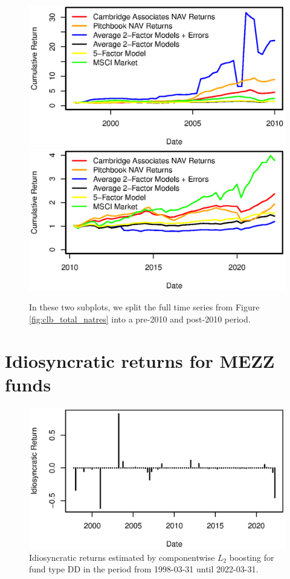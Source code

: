 \begin{figure}[H]
	\centering
	\includegraphics{Figures/XTotalErrorSeriesNATRESpre2010}
	\includegraphics{Figures/XTotalErrorSeriesNATRESpost2010}
	\caption{
		In these two subplots, we split the full time series from Figure \ref{fig:clb_total_natres} into a pre-2010 and post-2010 period.
	}
	\label{fig:clb_pre_post_2010_natres}
\end{figure}


\section{Idiosyncratic returns for MEZZ funds}
\label{sec:MEZZ_errors}


\begin{figure}[H]
	\centering
	\includegraphics{Figures/XErrorSeriesMEZZ}
	\caption{Idiosyncratic returns estimated by componentwise $L_2$ boosting for fund type DD in the period from 1998-03-31 until 2022-03-31.}
	\label{fig:clb_idio_MEZZ}
\end{figure}

